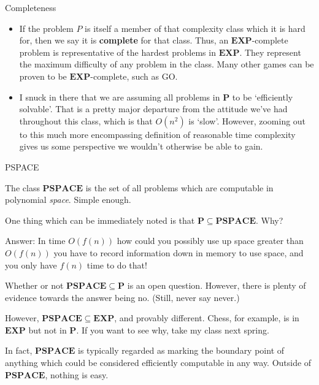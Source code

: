 \documentclass{beamer}
\begin{document}
\begin{frame}{Completeness}
    \begin{itemize}
        \item If the problem $P$ is itself a member of that complexity class which it is hard for, then we say it is \textbf{complete} for that class. Thus, an $\mathbf{EXP}$-complete problem is representative of the hardest problems in $\mathbf{EXP}$. They represent the maximum difficulty of any problem in the class. Many other games can be proven to be $\mathbf{EXP}$-complete, such as GO. 
        \item I snuck in there that we are assuming all problems in $\mathbf{P}$ to be `efficiently solvable'. That is a pretty major departure from the attitude we've had throughout this class, which is that $O(n^2)$ is `slow'. However, zooming out to this much more encompassing definition of reasonable time complexity gives us some perspective we wouldn't otherwise be able to gain. 
    \end{itemize}
\end{frame}

\begin{frame}{PSPACE}
    \begin{itemize}
        {\small \item The class $\mathbf{PSPACE}$ is the set of all problems which are computable in polynomial \emph{space}. Simple enough. \pause 
        \item One thing which can be immediately noted is that $\mathbf{P} \subseteq \mathbf{PSPACE}$. Why? \pause 
        \item Answer: In time $O(f(n))$ how could you possibly use up space greater than $O(f(n))$ you have to record information down in memory to use space, and you only have $f(n)$ time to do that!
        \item Whether or not $\mathbf{PSPACE} \subseteq \mathbf{P}$ is an open question. However, there is plenty of evidence towards the answer being no. (Still, never say never.) 
        \item However, $\mathbf{PSPACE} \subseteq \mathbf{EXP}$, and provably different. Chess, for example, is in $\mathbf{EXP}$ but not in $\mathbf{P}$. If you want to see why, take my class next spring. 
        \item In fact, $\mathbf{PSPACE}$ is typically regarded as marking the boundary point of anything which could be considered efficiently computable in any way. Outside of $\mathbf{PSPACE}$, nothing is easy. }
    \end{itemize}
\end{frame}
\end{document}
